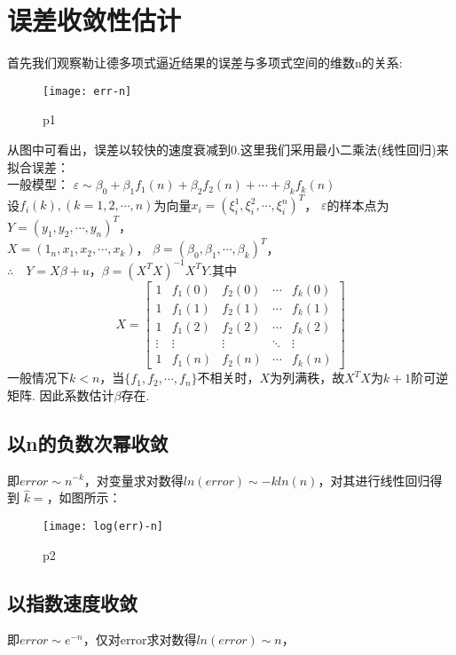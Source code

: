 \documentclass{article}
\begin{document}
    \section{误差收敛性估计}
    首先我们观察勒让德多项式逼近结果的误差与多项式空间的维数n的关系:
    \begin{figure}[H]
        \centering
        \texttt{[image: err-n]}
        \caption{p1}
    \end{figure}
    从图中可看出，误差以较快的速度衰减到0.这里我们采用最小二乘法(线性回归)来拟合误差：\\
    一般模型：
    $\varepsilon \sim \beta_0+\beta_1f_1(n)+\beta_2f_2(n)+\cdots+\beta_kf_k(n)$\\
    设$f_i(k),(k=1,2,\cdots,n)$为向量$x_i=(\xi_i^1,\xi_i^2,\cdots,\xi_i^n)^T$，
    $\varepsilon$的样本点为$Y=(y_1,y_2,\cdots,y_n)^T$，\\
    $X=(1_n,x_1,x_2,\cdots,x_k)$，
    $\beta=(\beta_0,\beta_1,\cdots,\beta_k)^T$，\\
    $\therefore \quad Y=X\beta+u$，$\beta=(X^TX)^{-1}X^TY$.其中
    $$
    X=\begin{bmatrix}
        1 & f_1(0) & f_2(0) & \cdots & f_k(0)\\
        1 & f_1(1) & f_2(1) & \cdots & f_k(1)\\
        1 & f_1(2) & f_2(2) & \cdots & f_k(2)\\
        \vdots & \vdots & \vdots & \ddots & \vdots \\
        1 & f_1(n) & f_2(n) & \cdots & f_k(n)
    \end{bmatrix}
    $$
    一般情况下$k<n$，当$\{f_1,f_2,\cdots,f_n\}$不相关时，$X$为列满秩，故$X^TX$为$k+1$阶可逆矩阵.
    因此系数估计$\beta$存在.


    \subsection{以n的负数次幂收敛}
    即$error\sim n^{-k}$，对变量求对数得$ln(error)\sim -kln(n)$，对其进行线性回归得到
    $\widehat{k} = $，如图所示：
    \begin{figure}[H]
        \centering
        \texttt{[image: log(err)-n]}
        \caption{p2}
    \end{figure}

    \subsection{以指数速度收敛}
    即$error\sim e^{-n}$，仅对error求对数得$ln(error)\sim n$，
\end{document}
